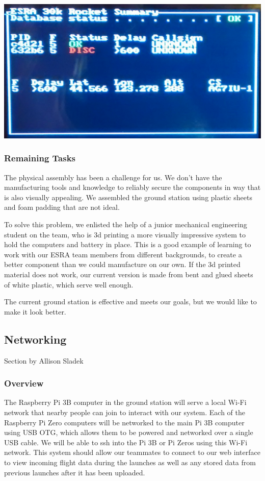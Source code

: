 \documentclass[onecolumn, draftclsnofoot, 10pt, compsoc]{IEEEtran}
\begin{document}
\begin{center}
	\includegraphics[width=.5\textwidth]{images/monitor.eps}
    \label{gs-monitor}
\end{center}

\subsubsection{Remaining Tasks}
The physical assembly has been a challenge for us.  We don't have the manufacturing tools and knowledge to reliably secure the components in way that is also visually appealing.  We assembled the ground station using plastic sheets and foam padding that are not ideal.

To solve this problem, we enlisted the help of a junior mechanical engineering student on the team, who is 3d printing a more visually impressive system to hold the computers and battery in place.  This is a good example of learning to work with our ESRA team members from different backgrounds, to create a better component than we could manufacture on our own.  If the 3d printed material does not work, our current version is made from bent and glued sheets of white plastic, which serve well enough.

The current ground station is effective and meets our goals, but we would like to make it look better.


\subsection{Networking}
Section by Allison Sladek

\subsubsection{Overview}
The Raspberry Pi 3B computer in the ground station will serve a local Wi-Fi network that nearby people can join to interact with our system. 
Each of the Raspberry Pi Zero computers will be networked to the main Pi 3B computer using USB OTG, which allows them to be powered and networked over a single USB cable.  
We will be able to ssh into the Pi 3B or Pi Zeros using this Wi-Fi network. 
This system should allow our teammates to connect to our web interface to view incoming flight data during the launches as well as any stored data from previous launches after it has been uploaded. 
\end{document}
